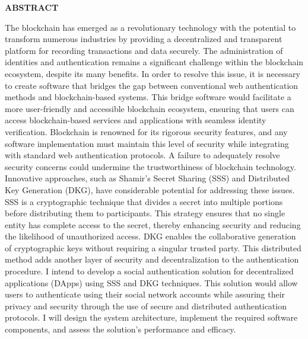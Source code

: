 \documentclass[../Main.tex]{subfiles}
\begin{document}
\begin{center}
    \Large{\textbf{ABSTRACT}}\\
\end{center}
\vspace{1cm}

The blockchain has emerged as a revolutionary technology with the potential to transform numerous industries by providing a decentralized and transparent platform for recording transactions and data securely. The administration of identities and authentication remains a significant challenge within the blockchain ecosystem, despite its many benefits. In order to resolve this issue, it is necessary to create software that bridges the gap between conventional web authentication methods and blockchain-based systems. This bridge software would facilitate a more user-friendly and accessible blockchain ecosystem, ensuring that users can access blockchain-based services and applications with seamless identity verification. Blockchain is renowned for its rigorous security features, and any software implementation must maintain this level of security while integrating with standard web authentication protocols. A failure to adequately resolve security concerns could undermine the trustworthiness of blockchain technology. Innovative approaches, such as Shamir's Secret Sharing\cite{shamir1979share} (SSS)  and Distributed Key Generation\cite{abadi2016distributed} (DKG), have considerable potential for addressing these issues. SSS is a cryptographic technique that divides a secret into multiple portions before distributing them to participants. This strategy ensures that no single entity has complete access to the secret, thereby enhancing security and reducing the likelihood of unauthorized access. DKG enables the collaborative generation of cryptographic keys without requiring a singular trusted party. This distributed method adds another layer of security and decentralization to the authentication procedure. I intend to develop a social authentication solution for decentralized applications (DApps) using SSS and DKG techniques. This solution would allow users to authenticate using their social network accounts while assuring their privacy and security through the use of secure and distributed authentication protocols. I will design the system architecture, implement the required software components, and assess the solution's performance and efficacy.
\end{document}
